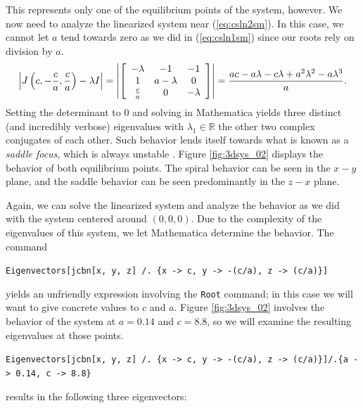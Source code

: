 \documentclass{article}
\begin{document}
This represents only one of the equilibrium points of the system, however. We now need to analyze the linearized system near (\ref{eq:csln2sm}). In this case, we cannot let $a$ tend towards zero as we did in (\ref{eq:csln1sm}) since our roots rely on division by $a$.
\[
	\left|J\left(c,-\frac{c}{a},\frac{c}{a}\right) -\lambda I\right| =
	\left|
	\left[
	\begin{array}{c c c}
		-\lambda    & -1          & -1       \\
		1           & a - \lambda & 0        \\
		\frac{c}{a} & 0           & -\lambda
	\end{array}
	\right]
	\right| =
	\frac{ ac - a\lambda - c\lambda + a^{2}\lambda^{2} -a\lambda^{3}}{a}.
\]
Setting the determinant to $0$ and solving in Mathematica yields three distinct (and incredibly verbose) eigenvalues with $\lambda_{1}\in\mathbb{R}$ the other two complex conjugates of each other. Such behavior lends itself towards what is known as a \textit{saddle focus}, which is always unstable \cite{equilibria}. Figure \ref{fig:3dsys_02} displays the behavior of both equilibrium points. The spiral behavior can be seen in the $x-y$ plane, and the saddle behavior can be seen predominantly in the $z-x$ plane.

Again, we can solve the linearized system and analyze the behavior as we did with the system centered around $(0,0,0)$. Due to the complexity of the eigenvalues of this system, we let Mathematica determine the behavior. The command
\begin{center}
	\texttt{Eigenvectors[jcbn[x, y, z] /. \{x -> c, y -> -(c/a), z -> (c/a)\}]}
\end{center}
yields an unfriendly expression involving the \texttt{Root} command; in this case we will want to give concrete values to $c$ and $a$. Figure \ref{fig:3dsys_02} involves the behavior of the system at $a=0.14$ and $c=8.8$, so we will examine the resulting eigenvalues at those points.
\begin{center}
	\texttt{Eigenvectors[jcbn[x, y, z] /. \{x -> c, y -> -(c/a), z -> (c/a)\}]/.\{a -> 0.14, c -> 8.8\}}
\end{center}
results in the following three eigenvectors:
\end{document}
